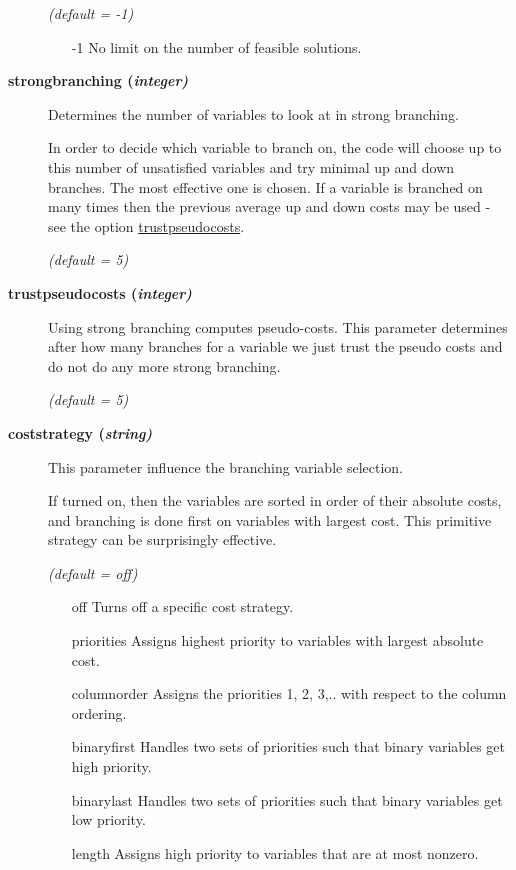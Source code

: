 \begin{description}
\textsl{(default = -1)}
\begin{itemize}
\item[-1] 
No limit on the number of feasible solutions.
\end{itemize}

\item[\label{strongbranching}\hypertarget{strongbranching}
{\textbf{strongbranching (\slshape{integer})}}]\hspace{1.0in}

Determines the number of variables to look at in strong branching.

In order to decide which variable to branch on, the code will choose up to this number of unsatisfied variables and try minimal up and down branches.
The most effective one is chosen.
If a variable is branched on many times then the previous average up and down costs may be used - see the option \hyperlink{trustpseudocosts}{trustpseudocosts}.

\textsl{(default = 5)}

\item[\label{trustpseudocosts}\hypertarget{trustpseudocosts}
{\textbf{trustpseudocosts (\slshape{integer})}}]\hspace{1.0in}

Using strong branching computes pseudo-costs.
This parameter determines after how many branches for a variable we just trust the pseudo costs and do not do any more strong branching.

\textsl{(default = 5)}

\item[\label{coststrategy}\hypertarget{coststrategy}
{\textbf{coststrategy (\slshape{string})}}]\hspace{1.0in}

This parameter influence the branching variable selection.

If turned on, then the variables are sorted in order of their absolute costs, and branching is done first on variables with largest cost.
This primitive strategy can be surprisingly effective.

\textsl{(default = off)}
\begin{itemize}
\item[off] 
Turns off a specific cost strategy.
\item[priorities] 
Assigns highest priority to variables with largest absolute cost.
\item[columnorder] 
Assigns the priorities 1, 2, 3,.. with respect to the column ordering.
\item[binaryfirst] 
Handles two sets of priorities such that binary variables get high priority.
\item[binarylast] 
Handles two sets of priorities such that binary variables get low priority.
\item[length] 
Assigns high priority to variables that are at most nonzero.
\end{itemize}


\end{description}
